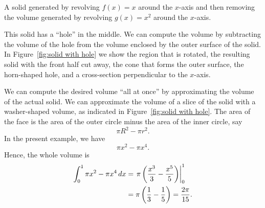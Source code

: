 \begin{marginfigure}
\caption{A solid generated by revolving $f(x) = x$ around the $x$-axis
  and then removing the volume generated by revolving $g(x) = x^2$
  around the $x$-axis.}
\label{fig:solid with hole}
\end{marginfigure}


\begin{solution}
This solid has a ``hole'' in the middle. We can compute the volume by
subtracting the volume of the hole from the volume enclosed by the
outer surface of the solid. In Figure~\ref{fig:solid with hole} we
show the region that is rotated, the resulting solid with the front
half cut away, the cone that forms the outer surface, the horn-shaped
hole, and a cross-section perpendicular to the $x$-axis.

We can compute the desired volume ``all at once'' by approximating the
volume of the actual solid. We can approximate the volume of a slice
of the solid with a washer-shaped volume, as indicated in
Figure~\ref{fig:solid with hole}. The area of the face is the area of
the outer circle minus the area of the inner circle, say
\[
\pi R^2-\pi r^2.
\] 
In the present example, we have
\[
\pi x^2 - \pi x^4. 
\]
Hence, the whole volume is
\begin{align*}
  \int_0^1 \pi x^2-\pi x^4\, d x &= \left.\pi\left({x^3\over3}-{x^5\over5}\right)\right|_0^1\\
&=\pi\left({1\over3}-{1\over5}\right)={2\pi\over15}.
\end{align*}
\end{solution}


